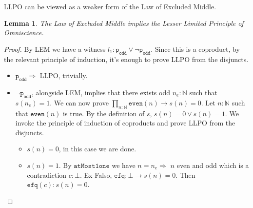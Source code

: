 \documentclass[12pt]{report}
\newtheorem{lem}[thm]{Lemma}
\theoremstyle{definition}
\begin{document}
LLPO can be viewed as a weaker form of the Law of Excluded Middle. 

\begin{lem} 
The Law of Excluded Middle implies the Lesser Limited Principle of Omniscience.
\end{lem}

\begin{proof}
By LEM we have a witness $ l_1 :\mathtt{p_{odd}} \vee \neg \mathtt{p_{odd}}$. 
Since this is a coproduct, by the relevant principle of induction, it's enough to prove LLPO from the disjuncts. 
\begin{itemize}
	\item $\mathtt{p_{odd}} \Rightarrow $ LLPO, trivially.

	\item $\neg \mathtt{p_{odd}}$, alongside LEM, implies that there exists odd $n_e : \mathbb{N}$ such that $s(n_e) = 1$. 
	We can now prove $\prod_{n : \mathbb{N}} \mathtt{even}(n) \rightarrow s(n) = 0$. 
	Let $n : \mathbb{N}$ such that $\mathtt{even}(n)$ is true. 
	By the definition of $s$, $s(n) = 0 \vee s(n) = 1$.
	We invoke the principle of induction of coproducts and prove LLPO from the disjuncts. 
	\begin{itemize}
		\item $s(n) = 0$, in this case we are done.
		\item $s(n) = 1$. 
		By $\mathtt{atMost1one}$ we have $n = n_e \Rightarrow $ $n$ even and odd which is a contradiction $c : \bot$. 
		Ex Falso,  $\mathtt{efq} : \bot \rightarrow s(n) = 0$. 
		Then $\mathtt{efq}(c) : s(n) = 0$.
	\end{itemize}
\end{itemize}
\end{proof}
\end{document}
